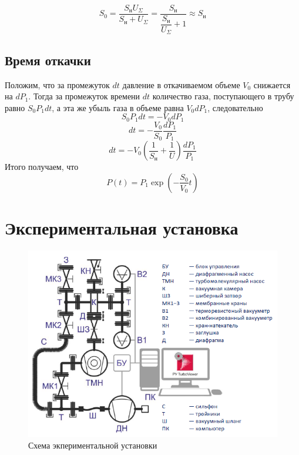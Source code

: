 \documentclass[a4paper, 12pt]{article}%
\begin{document}
\[S_0 = \dfrac{S_{\text{н}}U_{\Sigma}}{S_{\text{н}} + U_{\Sigma}} = \dfrac{S_{\text{н}}}{\dfrac{S_{\text{н}}}{U_{\Sigma}} + 1} \approx S_{\text{н}} \]	
\subsection*{Время откачки}
Положим, что за промежуток $dt$ давление в откачиваемом объеме $V_0$ снижается на $dP_1$. Тогда за промежуток времени $dt$ количество газа, поступающего в трубу равно $S_0 P_1 dt$, а эта же убыль газа в объеме равна $V_0 dP_1$, следовательно 
\[S_0 P_1 dt = -V_0 dP_1\]
\[dt = -\dfrac{V_0}{S_0} \dfrac{dP_1}{P_1}\]
\[dt = -V_0 \left( \dfrac{1}{S_{ \text{н} }} + \dfrac{1}{U} \right) \dfrac{dP_1}{P_1}\]
Итого получаем, что 
\[P(t) = P_1 \exp \left( -\dfrac{S_0}{V_0} t \right) \] 
\section*{Экспериментальная установка}
\begin{figure}[h]
\includegraphics[width = \textwidth]{231_1.png}
\caption{Схема экпериментальной установки}
\end{figure}
\end{document}
